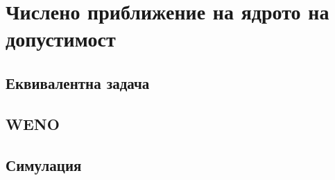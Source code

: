 \section{Числено приближение на ядрото на допустимост}
\subsection{Еквивалентна задача}
\cite{Osher2003}
\subsection{WENO}
\cite{Osher2003}
\subsection{Симулация}
